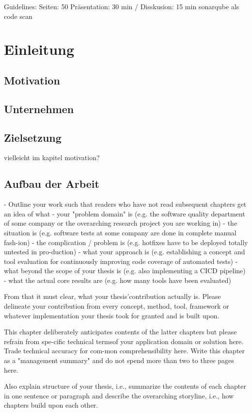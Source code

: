 Guidelines:
Seiten: 50
Präsentation: 30 min / Disskusion: 15 min
sonarqube als code scan

\section{Einleitung}

\subsection{Motivation}
\subsection{Unternehmen}
\subsection{Zielsetzung}
vielleicht im kapitel motivation?
\subsection{Aufbau der Arbeit}

- Outline your work such that readers who have not read subsequent chapters get an idea of what
  - your "problem domain" is (e.g. the software quality department of some company or the overarching research project you are working in)
  - the situation is (e.g. software tests at some company are done in complete manual fash-ion)
  - the complication / problem is (e.g. hotfixes have to be deployed totally untested in pro-duction)
  - what your approach is (e.g. establishing a concept and tool evaluation for continuously improving code coverage of automated tests)
  - what beyond the scope of your thesis is (e.g. also implementing a CICD pipeline)
  - what the actual core results are (e.g. how many tools have been evaluated)

From that it must clear, what your thesis'contribution actually is. Please delineate your contribution from every concept, method, tool, framework or whatever implementation your thesis took for granted and is built upon.

This chapter deliberately anticipates contents of the latter chapters but please refrain from spe-cific technical termsof your application domain or solution here. Trade technical accuracy for com-mon comprehensibility here. Write this chapter as a "management summary" and do not spend more than two to three pages here.

Also explain structure of your thesis, i.e., summarize the contents of each chapter in one sentence or paragraph and describe the overarching storyline, i.e., how chapters build upon each other.

